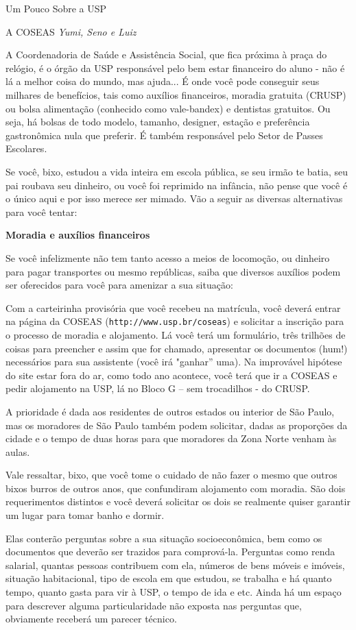 \begin{secao}{Um Pouco Sobre a USP}
\begin{subsecao}{A COSEAS}
{\em Yumi, Seno e Luiz}

A Coordenadoria de Saúde e Assistência Social, que fica próxima à praça do relógio,
é o órgão da USP responsável pelo bem estar financeiro do aluno - não é lá a
melhor coisa do mundo, mas ajuda... É onde você pode conseguir seus milhares de
benefícios, tais como auxílios financeiros, moradia gratuita (CRUSP) ou bolsa
alimentação (conhecido como vale-bandex) e dentistas gratuitos. Ou seja, há
bolsas de todo modelo, tamanho, designer, estação e preferência gastronômica
nula que preferir. É também responsável pelo Setor de Passes Escolares. 

Se você, bixo, estudou a vida inteira em escola pública, se seu irmão te batia,
seu pai roubava seu dinheiro, ou você foi reprimido na infância, não pense que
você é o único aqui e por isso merece ser mimado. Vão a seguir as diversas
alternativas para você tentar:

{\bf Moradia e auxílios financeiros}

Se você infelizmente não tem tanto acesso a meios de locomoção, ou dinheiro para
pagar transportes ou mesmo repúblicas, saiba que diversos auxílios podem ser
oferecidos para você para amenizar a sua situação:

Com a carteirinha provisória que você recebeu na matrícula, você deverá entrar
na página da COSEAS ({\tt http://www.usp.br/coseas}) e solicitar a inscrição
para o processo de moradia e alojamento. Lá você terá um formulário, três
trilhões de coisas para preencher e assim que for chamado, apresentar os
documentos (hum!) necessários para sua assistente (você irá "ganhar” uma). Na
improvável hipótese do site estar fora do ar, como todo ano acontece, você terá
que ir a COSEAS e pedir alojamento na USP, lá no Bloco G – sem trocadilhos - do
CRUSP.

A prioridade é dada aos residentes de outros estados ou interior de São Paulo,
mas os moradores de São Paulo também podem solicitar, dadas as proporções da
cidade e o tempo de duas horas para que moradores da Zona Norte venham às aulas. 

Vale ressaltar, bixo, que você tome o cuidado de não fazer o mesmo que outros
bixos burros de outros anos, que confundiram alojamento com moradia. São dois
requerimentos distintos e você deverá solicitar os dois se realmente quiser
garantir um lugar para tomar banho e dormir.

Elas conterão perguntas sobre a sua situação socioeconômica, bem como os
documentos que deverão ser trazidos para comprová-la. Perguntas como renda
salarial, quantas pessoas contribuem com ela, números de bens móveis e imóveis,
situação habitacional, tipo de escola em que estudou, se trabalha e há quanto
tempo, quanto gasta para vir à USP, o tempo de ida e etc. Ainda há um espaço
para descrever alguma particularidade não exposta nas perguntas que, obviamente
receberá um parecer técnico.


\end{subsecao}
\end{secao}
